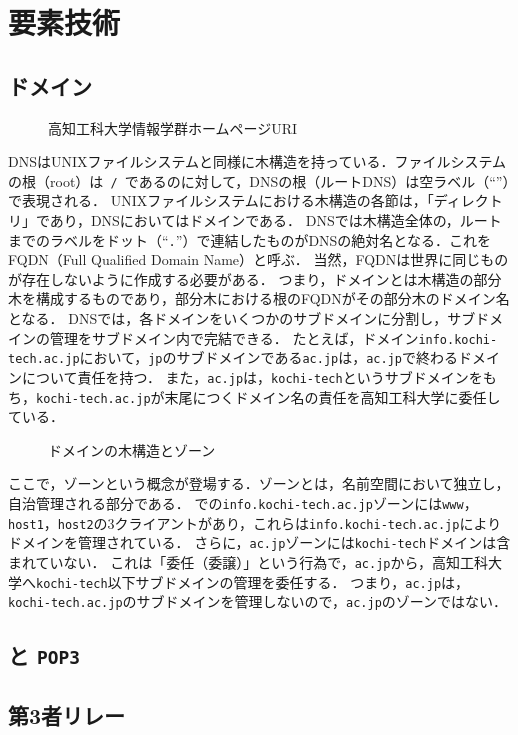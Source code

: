 \section{要素技術}
\subsection{ドメイン}\label{chap:domain}
\newcommand{\popt}{\texttt{POP3}}
\begin{wrapfigure}{r}[0mm]{.55\textwidth}
    \vspace{-1.5cm}
    \centering
    
    \vspace{1em}
    \caption{高知工科大学情報学群ホームページURI}
    \vspace{-1cm}
\end{wrapfigure}
DNSはUNIXファイルシステムと同様に木構造を持っている．ファイルシステムの根（root）は\texttt{\ /\ }であるのに対して，DNSの根（ルートDNS）は空ラベル（``''）で表現される．
UNIXファイルシステムにおける木構造の各節は，「ディレクトリ」であり，DNSにおいてはドメインである．
DNSでは木構造全体の，ルートまでのラベルをドット（``\texttt{.}''）で連結したものがDNSの絶対名となる．これをFQDN（Full Qualified Domain Name）と呼ぶ．
当然，FQDNは世界に同じものが存在しないように作成する必要がある．
つまり，ドメインとは木構造の部分木を構成するものであり，部分木における根のFQDNがその部分木のドメイン名となる．
DNSでは，各ドメインをいくつかのサブドメインに分割し，サブドメインの管理をサブドメイン内で完結できる．
たとえば，ドメイン\texttt{info.kochi-tech.ac.jp}において，\texttt{jp}のサブドメインである\texttt{ac.jp}は，\texttt{ac.jp}で終わるドメインについて責任を持つ．
また，\texttt{ac.jp}は，\texttt{kochi-tech}というサブドメインをもち，\texttt{kochi-tech.ac.jp}が末尾につくドメイン名の責任を高知工科大学に委任している．

\begin{wrapfigure}{r}[0mm]{.62\textwidth}
    \centering
    
    \caption{ドメインの木構造とゾーン}
    \label{fig:ドメインの木構造とゾーン}
\end{wrapfigure}
ここで，ゾーンという概念が登場する．ゾーンとは，名前空間において独立し，自治管理される部分である．
での\texttt{info.kochi-tech.ac.jp}ゾーンには\texttt{www}，\texttt{host1}，\texttt{host2}の3クライアントがあり，これらは\texttt{info.kochi-tech.ac.jp}によりドメインを管理されている．
さらに，\texttt{ac.jp}ゾーンには\texttt{kochi-tech}ドメインは含まれていない．
これは「委任（委譲）」という行為で，\texttt{ac.jp}から，高知工科大学へ\texttt{kochi-tech}以下サブドメインの管理を委任する．
つまり，\texttt{ac.jp}は，\texttt{kochi-tech.ac.jp}のサブドメインを管理しないので，\texttt{ac.jp}のゾーンではない．
\subsection{\smtp と \popt}
\subsection{第3者リレー}